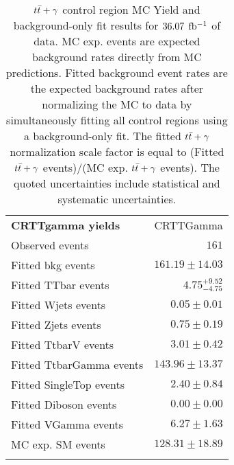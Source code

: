 

\begin{table}[!h]
\caption[$\ttbar+\gamma$ control region MC Yield and background-only fit results for $\intlumi$ $\ifb$ of data]{$\ttbar+\gamma$ control region MC Yield and background-only fit results for $\intlumi$ $\ifb$ of data. MC exp. events are expected background rates directly from MC predictions.  Fitted background event rates are the expected background rates after normalizing the MC to data by simultaneously fitting all control regions using a background-only fit.  The fitted $\ttbar+\gamma$ normalization scale factor is equal to (Fitted $\ttbar+\gamma$ events)/(MC exp. $\ttbar+\gamma$ events). The quoted uncertainties include statistical and systematic uncertainties. }
\label{table.bkgonly.CRTTgamma}
\begin{center}
\setlength{\tabcolsep}{0.0pc}
{\small
\begin{tabular*}{\textwidth}{@{\extracolsep{\fill}}lr}
\noalign{\smallskip}\hline\noalign{\smallskip}
{\bf CRTTgamma yields}           & CRTTGamma              \\[-0.05cm]
\noalign{\smallskip}\hline\noalign{\smallskip}
Observed events          & $161$                    \\
\noalign{\smallskip}\hline\noalign{\smallskip}
Fitted bkg events         & $161.19 \pm 14.03$              \\
\noalign{\smallskip}\hline\noalign{\smallskip}
        Fitted TTbar events         & $4.75_{-4.75}^{+9.52}$              \\
        Fitted Wjets events         & $0.05 \pm 0.01$              \\
        Fitted Zjets events         & $0.75 \pm 0.19$              \\
        Fitted TtbarV events         & $3.01 \pm 0.42$              \\
        Fitted TtbarGamma events         & $143.96 \pm 13.37$              \\
        Fitted SingleTop events         & $2.40 \pm 0.84$              \\
        Fitted Diboson events         & $0.00 \pm 0.00$              \\
        Fitted VGamma events         & $6.27 \pm 1.63$              \\
 \noalign{\smallskip}\hline\noalign{\smallskip}
MC exp. SM events              & $128.31 \pm 18.89$              \\
\noalign{\smallskip}\hline\noalign{\smallskip}

\end{tabular*}}
\end{center}
\end{table}

